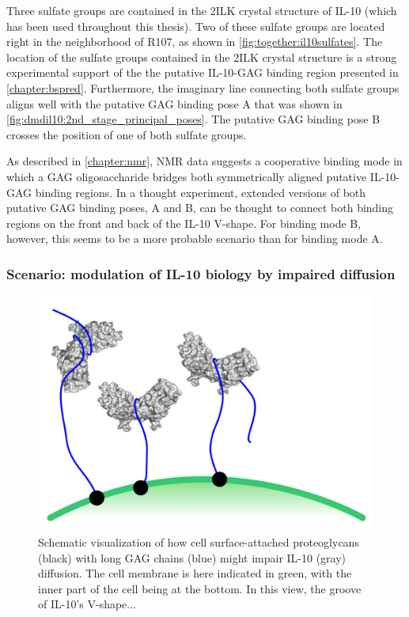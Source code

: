 Three sulfate groups are contained in the 2ILK crystal structure of IL-10 (which
has been used throughout this thesis). Two of these sulfate groups are located
right in the neighborhood of R107, as shown in \cref{fig:together:il10sulfates}.
The location of the sulfate groups contained in the 2ILK crystal structure is a
strong experimental support of the the putative IL-10-GAG binding region
presented in \cref{chapter:bspred}. Furthermore, the imaginary line connecting
both sulfate groups aligns well with the putative GAG binding pose A that was
shown in \cref{fig:dmdil10:2nd_stage_principal_poses}. The putative GAG binding
pose B crosses the position of one of both sulfate groups.

As described in \cref{chapter:nmr}, NMR data suggests a cooperative binding mode
in which a GAG oligosaccharide bridges both symmetrically aligned putative
IL-10-GAG binding regions. In a thought experiment, extended versions of both
putative GAG binding poses, A and B, can be thought to connect both binding
regions on the front and back of the IL-10 V-shape. For binding mode B, however,
this seems to be a more probable scenario than for binding mode A.


\subsubsection{Scenario: modulation of IL-10 biology by impaired diffusion}

\begin{figure}
\centering
\includegraphics[width=1.0\textwidth]{gfx/together/agglomeration_small.jpg}
\caption[]{
Schematic visualization of how cell surface-attached proteoglycans (black) with
long GAG chains (blue) might impair IL-10 (gray) diffusion. The cell membrane is
here indicated in green, with the inner part of the cell being at the bottom. In
this view, the groove of IL-10's V-shape...}
\label{fig:together:diffusionimpaired}
\end{figure}

